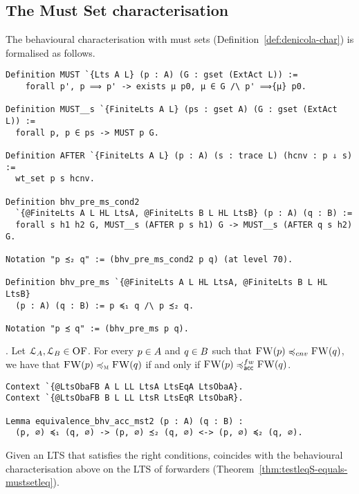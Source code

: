 \subsection{The Must Set characterisation}

The behavioural characterisation with must sets
(Definition~\ref{def:denicola-char}) is formalised as follows.

\begin{mdframed}
  \begin{verbatim}
Definition MUST `{Lts A L} (p : A) (G : gset (ExtAct L)) :=
    forall p', p ⟹ p' -> exists μ p0, μ ∈ G /\ p' ⟹{μ} p0.

Definition MUST__s `{FiniteLts A L} (ps : gset A) (G : gset (ExtAct L)) :=
  forall p, p ∈ ps -> MUST p G.

Definition AFTER `{FiniteLts A L} (p : A) (s : trace L) (hcnv : p ⇓ s) :=
  wt_set p s hcnv.

Definition bhv_pre_ms_cond2
  `{@FiniteLts A L HL LtsA, @FiniteLts B L HL LtsB} (p : A) (q : B) :=
  forall s h1 h2 G, MUST__s (AFTER p s h1) G -> MUST__s (AFTER q s h2) G.

Notation "p ≾₂ q" := (bhv_pre_ms_cond2 p q) (at level 70).

Definition bhv_pre_ms `{@FiniteLts A L HL LtsA, @FiniteLts B L HL LtsB}
  (p : A) (q : B) := p ≼₁ q /\ p ≾₂ q.

Notation "p ≾ q" := (bhv_pre_ms p q).
  \end{verbatim}
\end{mdframed}


.
Let $\mathcal{L}_A, \mathcal{L}_B \in \textsc{OF}$.
For every $p \in A$  and
$q \in B $ such that $\liftFW{ \serverA } \bhvleqone \liftFW{ \serverB }$,
we have that
$\textsc{FW}( p ) \preccurlyeq_{\textsc{m}} \textsc{FW}( q )$ if and only if
$\liftFW{ \serverA } \asleqAfw \liftFW{ \serverB }$.

\begin{mdframed}
\begin{verbatim}
Context `{@LtsObaFB A L LL LtsA LtsEqA LtsObaA}.
Context `{@LtsObaFB B L LL LtsR LtsEqR LtsObaR}.

Lemma equivalence_bhv_acc_mst2 (p : A) (q : B) :
  (p, ∅) ≼₁ (q, ∅) -> (p, ∅) ≾₂ (q, ∅) <-> (p, ∅) ≼₂ (q, ∅).
\end{verbatim}
\end{mdframed}

Given an LTS that satisfies the right conditions, \mustequivalence coincides
with the behavioural characterisation above on the LTS of forwarders
(Theorem~\ref{thm:testleqS-equals-mustsetleq}).

